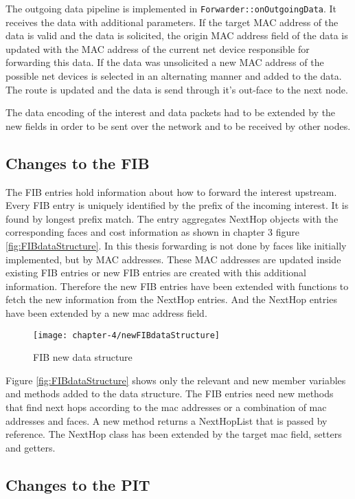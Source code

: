 The outgoing data pipeline is implemented in \texttt{Forwarder::onOutgoingData}. It receives the data with additional parameters. If the target MAC address of the data is valid and the data is solicited, the origin MAC address field of the data is updated with the MAC address of the current net device responsible for forwarding this data. If the data was unsolicited a new MAC address of the possible net devices is selected in an alternating manner and added to the data. The route is updated and the data is send through it's out-face to the next node.

The data encoding of the interest and data packets had to be extended by the new fields in order to be sent over the network and to be received by other nodes.

\subsection{Changes to the FIB}

The FIB entries hold information about how to forward the interest upstream. Every FIB entry is uniquely identified by the prefix of the incoming interest. It is found by longest prefix match. The entry aggregates NextHop objects with the corresponding faces and cost information as shown in chapter 3 figure \ref{fig:FIBdataStructure}.
In this thesis forwarding is not done by faces like initially implemented, but by MAC addresses. These MAC addresses are updated inside existing FIB entries or new FIB entries are created with this additional information. Therefore the new FIB entries have been extended with functions to fetch the new information from the NextHop entries. And the NextHop entries have been extended by a new mac address field.

\begin{figure}[H]
  \centering
  \texttt{[image: chapter-4/newFIBdataStructure]}
  \caption{FIB new data structure}
  \label{fig:newFIBdataStructure}
\end{figure}

Figure \ref{fig:FIBdataStructure} shows only the relevant and new member variables and methods added to the data structure. The FIB entries need new methods that find next hops according to the mac addresses or a combination of mac addresses and faces. A new method returns a NextHopList that is passed by reference. The NextHop class has been extended by the target mac field, setters and getters.

\subsection{Changes to the PIT}

